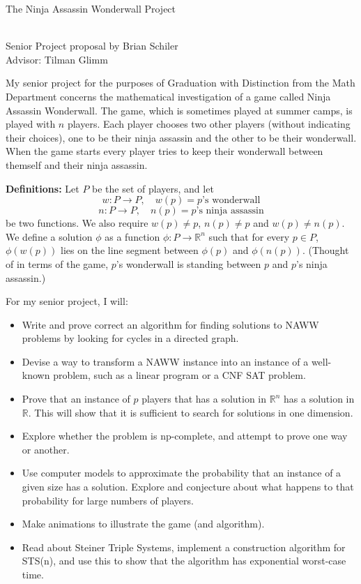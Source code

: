 \documentclass{article}
\begin{document}
\begin{center}
\begin{Large}
The Ninja Assassin Wonderwall Project
\end{Large}\\
Senior Project proposal by Brian Schiler\\
Advisor: Tilman Glimm\\
\date{}
\vspace{20pt}
\end{center}
My senior project for the purposes of Graduation with Distinction from the Math Department concerns the mathematical investigation of a game called Ninja Assassin Wonderwall. The game, which is sometimes played at summer camps, is played with $n$ players. Each player chooses two other players  (without indicating their choices), one to be their ninja assassin and the other to be their wonderwall. When the game starts every player tries to keep their wonderwall between themself and their ninja assassin. 

\textbf{Definitions:} Let $P$ be the set of players, and let 
\[w: P \to P,\quad w(p) = \text{$p$'s wonderwall}\] 
\[n: P \to P,\quad n(p) = \text{$p$'s ninja assassin}\] 
be two functions. We also require $w(p) \neq p$, $n(p)\neq p$ and $w(p)\neq n(p)$. We define a solution $\phi$ as a function $\phi: P \to \mathbb{R}^n$ such that for every $p \in P$, $\phi(w(p))$ lies on the line segment between $\phi(p)$ and $\phi(n(p))$. (Thought of in terms of the game, $p$'s wonderwall is standing between $p$ and $p$'s ninja assassin.) 

For my senior project, I will:

\begin{itemize}
    \item Write and prove correct an algorithm for finding solutions to NAWW problems by looking for cycles in a directed graph.
    \item Devise a way to transform a NAWW instance into an instance of a well-known problem, such as a linear program or a CNF SAT problem.
    \item Prove that an instance of $p$ players that has a solution in $\mathbb{R}^n$ has a solution in $\mathbb{R}$. This will show that it is sufficient to search for solutions in one dimension.
    \item Explore whether the problem is np-complete, and attempt to prove one way or another.
    \item Use computer models to approximate the probability that an instance of a given size has a solution. Explore and conjecture about what happens to that probability for large numbers of players.
    \item Make animations to illustrate the game (and algorithm).
    \item Read about Steiner Triple Systems, implement a construction algorithm for STS(n), and use this to show that the algorithm has exponential worst-case time.
\end{itemize}
\end{document}
